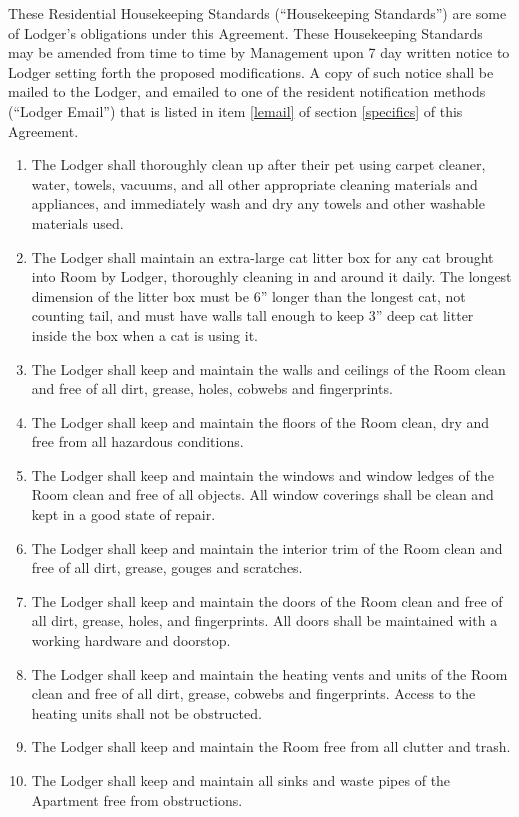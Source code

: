 \documentclass[12pt,letterpaper]{article}
\newcommand{\lodger}{Lodger}
\newcommand{\standards}{Residential Housekeeping Standards}
\newcommand{\management}{Management}
\newcommand{\apt}{Apartment}
\newcommand{\room}{Room}
\newcommand{\lemail}{Lodger Email}
\begin{document}
These \standards{} (``Housekeeping Standards'') are some of \lodger{}'s obligations under this Agreement. These Housekeeping Standards may be amended from time to time by \management{} upon 7 day written notice to \lodger{} setting forth the proposed modifications. A copy of such notice shall be mailed to the \lodger{}, and emailed to one of the resident notification methods (``\lemail{}'') that is listed in item \ref{lemail} of section \ref{specifics} of this Agreement. 
\begin{enumerate}
	\item The \lodger{} shall thoroughly clean up after their pet using carpet cleaner, water, towels, vacuums, and all other appropriate cleaning materials and appliances, and immediately wash and dry any towels and other washable materials used.
	\item The \lodger{} shall maintain an extra-large cat litter box for any cat brought into \room{} by \lodger{}, thoroughly cleaning in and around it daily. The longest dimension of the litter box must be 6'' longer than the longest cat, not counting tail, and must have walls tall enough to keep 3'' deep cat litter inside the box when a cat is using it.
	\item The \lodger{} shall keep and maintain the walls and ceilings of the \room{} clean and free of all dirt, grease, holes, cobwebs and fingerprints. 
	\item The \lodger{} shall keep and maintain the floors of the \room{} clean, dry and free from all hazardous conditions. 
	\item The \lodger{} shall keep and maintain the windows and window ledges of the \room{} clean and free of all objects. All window coverings shall be clean and kept in a good state of repair. 
	\item The \lodger{} shall keep and maintain the interior trim of the \room{} clean and free of all dirt, grease, gouges and scratches. 
	\item The \lodger{} shall keep and maintain the doors of the \room{} clean and free of all dirt, grease, holes, and fingerprints. All doors shall be maintained with a working hardware and doorstop. 
	\item The \lodger{} shall keep and maintain the heating vents and units of the \room{} clean and free of all dirt, grease, cobwebs and fingerprints. Access to the heating units shall not be obstructed. 
	\item The \lodger{} shall keep and maintain the \room{} free from all clutter and trash. 
	\item The \lodger{} shall keep and maintain all sinks and waste pipes of the \apt{} free from obstructions. 

\end{enumerate}
\end{document}

